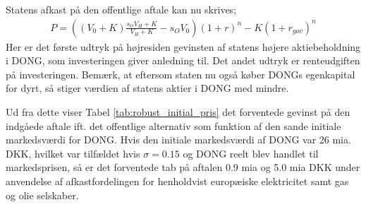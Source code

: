 \documentclass{article}
\begin{document}
Statens afkast på den offentlige aftale kan nu skrives;
\begin{align}
P=\left((V_0+K)\frac{s_O V_H+K}{V_H+K}-s_O V_0\right) (1+r)^n-K(1+r_{gov})^n
\label{eq:gov_capital_mod}
\end{align}
Her er det første udtryk på højresiden gevinsten af statens højere aktiebeholdning i DONG, som investeringen giver anledning til. Det andet udtryk er renteudgiften på investeringen. Bemærk, at eftersom staten nu også køber DONGs egenkapital for dyrt, så stiger værdien af statens aktier i DONG med mindre. %

Ud fra dette viser Tabel \ref{tab:robust_initial_pris} det forventede gevinst på den indgåede aftale ift. det offentlige alternativ som funktion af den sande initiale markedsværdi for DONG. Hvis den initiale markedsværdi af DONG var 26 mia. DKK, hvilket var tilfældet hvis $\sigma=0.15$ og DONG reelt blev handlet til markedsprisen, så er det forventede tab på aftalen 0.9 mia og 5.0 mia DKK under anvendelse af afkastfordelingen for henholdvist europæiske elektricitet samt gas og olie selskaber. 
\end{document}
